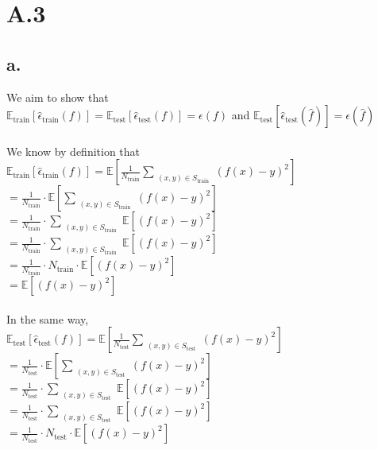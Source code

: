 \documentclass{article}
\newcommand{\1}{\mathbf{1}}
\newcommand{\E}{\mathbb{E}}
\begin{document}
\section*{A.3}
{\Large 

\subsection*{a.}

We aim to show that \\
$\E_{\text{train}}[\widehat{\epsilon}_{\text{train}}(f)] = \E_{\text{test}}[\widehat{\epsilon}_{\text{test}}(f)] = \epsilon(f)$ and  $\E_{\text{test}}[\widehat{\epsilon}_{\text{test}}(\widehat{f})] = \epsilon(\widehat{f})$ \\ \\

We know by definition that \\
$\E_{\text{train}}[\widehat{\epsilon}_{\text{train}}(f)] = \E[\frac{1}{N_{\text{train}}} \sum\limits_{\substack{(x,y) \in S_{\text{train}}}} (f(x) - y)^2]$ \\
$= \frac{1}{N_{\text{train}}} \cdot \E[\sum\limits_{\substack{(x,y) \in S_{\text{train}}}} (f(x) - y)^2]$ \\
$= \frac{1}{N_{\text{train}}} \cdot \sum\limits_{\substack{(x,y) \in S_{\text{train}}}} \E[(f(x) - y)^2]$ \\
$= \frac{1}{N_{\text{train}}} \cdot \sum\limits_{\substack{(x,y) \in S_{\text{train}}}} \E[(f(x) - y)^2]$ \\
$= \frac{1}{N_{\text{train}}} \cdot N_{\text{train}} \cdot \E[(f(x) - y)^2]$ \\
$= \E[(f(x) - y)^2]$ \\ \\
In the same way, \\
$\E_{\text{test}}[\widehat{\epsilon}_{\text{test}}(f)] = \E[\frac{1}{N_{\text{test}}} \sum\limits_{\substack{(x,y) \in S_{\text{test}}}} (f(x) - y)^2]$ \\
$= \frac{1}{N_{\text{test}}} \cdot \E[\sum\limits_{\substack{(x,y) \in S_{\text{test}}}} (f(x) - y)^2]$ \\
$= \frac{1}{N_{\text{test}}} \cdot \sum\limits_{\substack{(x,y) \in S_{\text{test}}}} \E[(f(x) - y)^2]$ \\
$= \frac{1}{N_{\text{test}}} \cdot \sum\limits_{\substack{(x,y) \in S_{\text{test}}}} \E[(f(x) - y)^2]$ \\
$= \frac{1}{N_{\text{test}}} \cdot N_{\text{test}} \cdot \E[(f(x) - y)^2]$ \\
}
\end{document}
